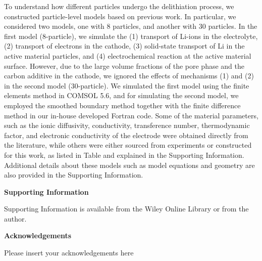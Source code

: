 \documentclass{WileyMSP-template}
\begin{document}
To understand how different particles undergo the delithiation
process, we constructed particle-level models based on previous
work\cite{thornton2014-2}. In particular, we considered two models,
one with 8 particles, and another with 30 particles. In the first
model (8-particle), we simulate the (1) transport of Li-ions in the
electrolyte, (2) transport of electrons in the cathode, (3)
solid-state transport of Li in the active material particles, and (4)
electrochemical reaction at the active material surface. However, due
to the large volume fractions of the pore phase and the carbon
additive in the cathode, we ignored the effects of mechanisms (1) and
(2) in the second model (30-particle). We simulated the first model
using the finite elements method in COMSOL 5.6, and for simulating the
second model, we employed the smoothed boundary method
\cite{thornton2012} together with the finite difference method in our
in-house developed Fortran code. Some of the material parameters, such
as the ionic diffusivity, conductivity, transference number,
thermodynamic factor, and electronic conductivity of the \nca{}
electrode were obtained directly from the
literature\cite{lindbergh2008,lindbergh2008-2}, while others were
either sourced from experiments or constructed for this work, as
listed in Table  and explained in the
Supporting Information. Additional details about these models such as
model equations and geometry are also provided in the Supporting
Information.

\medskip
\textbf{Supporting Information} \par %
Supporting Information is available from the Wiley Online Library or from the author.

\medskip
\textbf{Acknowledgements} \par %
Please insert your acknowledgements here
\end{document}
